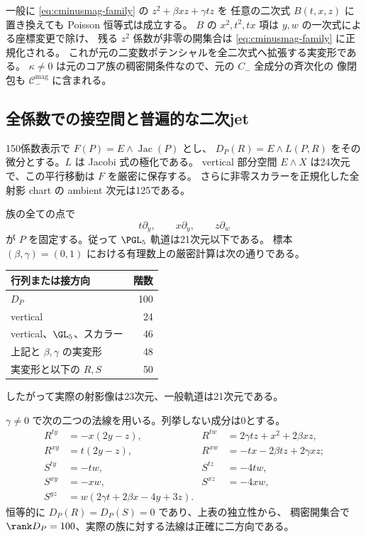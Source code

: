 一般に \eqref{eq:cminusmag-family} の $z^2+\beta xz+\gamma tz$ を
任意の二次式 $B(t,x,z)$ に置き換えても Poisson 恒等式は成立する。
$B$ の $x^2,t^2,tx$ 項は $y,w$ の一次式による座標変更で除け、
残る $z^2$ 係数が非零の開集合は \eqref{eq:cminusmag-family} に正規化される。
これが元の二変数ポテンシャルを全二次式へ拡張する実変形である。
$\kappa\ne0$ は元のコア族の稠密開条件なので、元の $C_-$ 全成分の斉次化の
像閉包も $\mathcal C_-^{\mathrm{mag}}$ に含まれる。

\subsection{全係数での接空間と普遍的な二次jet}

150係数表示で $F(P)=E\wedge\operatorname{Jac}(P)$ とし、
$D_P(R)=E\wedge L(P,R)$ をその微分とする。$L$ は Jacobi 式の極化である。
vertical 部分空間 $E\wedge X$ は24次元で、この平行移動は $F$ を厳密に保存する。
さらに非零スカラーを正規化した全射影 chart の ambient 次元は125である。

族の全ての点で
\[
 t\partial_y,\qquad x\partial_y,\qquad z\partial_w
\]
が $P$ を固定する。従って $\PGL_5$ 軌道は21次元以下である。
標本 $(\beta,\gamma)=(0,1)$ における有理数上の厳密計算は次の通りである。
\begin{center}
\begin{tabular}{lr}
\toprule
行列または接方向&階数\\\midrule
$D_P$&100\\
vertical&24\\
vertical、$\GL_5$、スカラー&46\\
上記と $\beta,\gamma$ の実変形&48\\
実変形と以下の $R,S$&50\\\bottomrule
\end{tabular}
\end{center}
したがって実際の射影像は23次元、一般軌道は21次元である。

$\gamma\ne0$ で次の二つの法線を用いる。列挙しない成分は0とする。
\begin{align*}
 R^{ty}&=-x(2y-z),& R^{tw}&=2\gamma tz+x^2+2\beta xz,\\
 R^{xy}&=t(2y-z),& R^{xw}&=-tx-2\beta tz+2\gamma xz;\\
 S^{ty}&=-tw,&S^{tz}&=-4tw,\\
 S^{xy}&=-xw,&S^{xz}&=-4xw,\\
 S^{yz}&=w(2\gamma t+2\beta x-4y+3z).&&
\end{align*}
恒等的に $D_P(R)=D_P(S)=0$ であり、上表の独立性から、
稠密開集合で $\rank D_P=100$、実際の族に対する法線は正確に二方向である。


